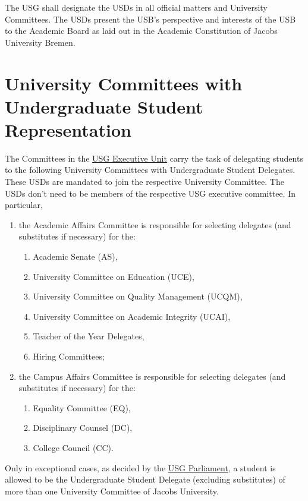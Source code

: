 
The USG shall designate the \acp{USD} in all official matters and University Committees. The USDs present the USB's perspective and interests of the USB to the Academic Board as laid out in the Academic Constitution of Jacobs University Bremen. 

\section{University Committees with Undergraduate Student Representation}
The Committees in the \hyperref[USGexecutiveUnitDef]{USG Executive Unit} carry the task of delegating students to the following University Committees with Undergraduate Student Delegates. These USDs are mandated to join the respective University Committee. The USDs don't need to be members of the respective USG executive committee. In particular,
\begin{enumerate}
\item the Academic Affairs Committee is responsible for selecting delegates (and substitutes if necessary) for the:
\begin{enumerate}
    \item Academic Senate (AS),
    \item University Committee on Education (UCE),
    \item University Committee on Quality Management (UCQM),
    \protect\item University Committee on Academic Integrity (UCAI),
    \item Teacher of the Year Delegates,
    \item Hiring Committees;
\end{enumerate}
\item the Campus Affairs Committee is responsible for selecting delegates (and substitutes if necessary) for the:
\begin{enumerate}
    \item Equality Committee (EQ),
    \item Disciplinary Counsel (DC),
    \item College Council (CC).
\end{enumerate}
\end{enumerate}
Only in exceptional cases, as decided by the \hyperref[USGParliamentDef]{USG Parliament}, a student is allowed to be the Undergraduate Student Delegate (excluding substitutes) of more than one University Committee of Jacobs University.


